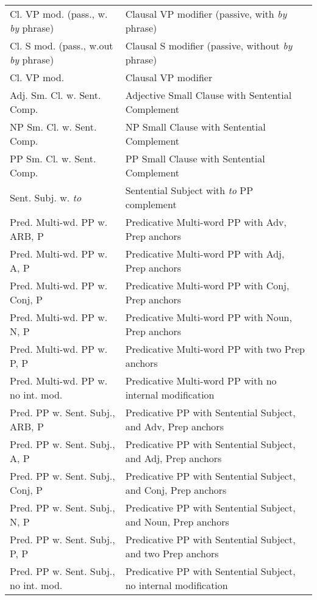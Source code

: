 \begin{tabular}{ll}
Cl. VP mod. (pass., w. {\it by} phrase)&Clausal VP modifier (passive, with
{\it by} phrase)\\
Cl. S mod. (pass., w.out {\it by} phrase)&Clausal S modifier (passive, without
{\it by} phrase) \\
Cl. VP mod.&Clausal VP modifier\\
Adj. Sm. Cl. w. Sent. Comp.&Adjective Small Clause with Sentential
Complement\\
NP Sm. Cl. w. Sent. Comp.&NP Small Clause with Sentential Complement\\
PP Sm. Cl. w. Sent. Comp.&PP Small Clause with Sentential Complement\\
Sent. Subj. w. {\it to} & Sentential Subject with {\it to} PP complement \\
Pred. Multi-wd. PP w. ARB, P & Predicative Multi-word PP with Adv, Prep anchors\\
Pred. Multi-wd. PP w. A, P & Predicative Multi-word PP with Adj, Prep anchors\\
Pred. Multi-wd. PP w. Conj, P & Predicative Multi-word PP with Conj, Prep
anchors\\
Pred. Multi-wd. PP w. N, P & Predicative Multi-word PP with Noun, Prep
anchors\\
Pred. Multi-wd. PP w. P, P & Predicative Multi-word PP with two Prep
anchors\\
Pred. Multi-wd. PP w. no int. mod. & Predicative Multi-word PP with no internal
modification\\
Pred. PP w. Sent. Subj., ARB, P & Predicative PP with Sentential Subject, and
Adv, Prep anchors\\
Pred. PP w. Sent. Subj., A, P & Predicative PP with Sentential Subject, and
Adj, Prep anchors\\
Pred. PP w. Sent. Subj., Conj, P & Predicative PP with Sentential Subject, and
Conj, Prep anchors\\
Pred. PP w. Sent. Subj., N, P & Predicative PP with Sentential Subject, and
Noun, Prep anchors\\
Pred. PP w. Sent. Subj., P, P & Predicative PP with Sentential Subject, and two
Prep anchors\\
Pred. PP w. Sent. Subj., no int. mod. & Predicative PP with Sentential Subject,
no internal modification\\
\end{tabular}
\normalsize
















